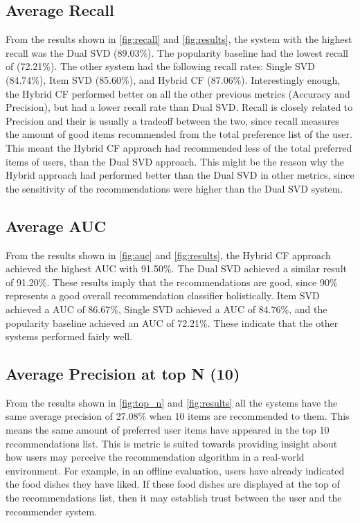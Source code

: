 \subsection{Average Recall}

From the results shown in \ref{fig:recall} and \ref{fig:results}, the system with the highest recall was the Dual SVD (89.03\%). The popularity baseline had the lowest recall of (72.21\%). The other system had the following recall rates: Single SVD (84.74\%), Item SVD (85.60\%), and Hybrid CF (87.06\%). Interestingly enough, the Hybrid CF performed better on all the other previous metrics (Accuracy and Precision), but had a lower recall rate than Dual SVD. Recall is closely related to Precision and their is usually a tradeoff between the two, since recall measures the amount of good items recommended from the total preference list of the user. This meant the Hybrid CF approach had recommended less of the total preferred items of users, than the Dual SVD approach. This might be the reason why the Hybrid approach had performed better than the Dual SVD in other metrics, since the sensitivity of the recommendations were higher than the Dual SVD system.

\subsection{Average AUC}

From the results shown in \ref{fig:auc} and \ref{fig:results}, the Hybrid CF approach achieved the highest AUC with 91.50\%. The Dual SVD achieved a similar result of 91.20\%. These results imply that the recommendations are good, since 90\% represents a good overall recommendation classifier holistically. Item SVD achieved a AUC of 86.67\%, Single SVD achieved a AUC of 84.76\%, and the popularity baseline achieved an AUC of 72.21\%. These indicate that the other systems performed fairly well. 

\subsection{Average Precision at top N (10)}

From the results shown in \ref{fig:top_n} and \ref{fig:results} all the systems have the same average precision of 27.08\% when 10 items are recommended to them. This means the same amount of preferred user items have appeared in the top 10 recommendations list. This is metric is suited towards providing insight about how users may perceive the recommendation algorithm in a real-world environment. For example, in an offline evaluation, users have already indicated the food dishes they have liked. If these food dishes are displayed at the top of the recommendations list, then it may establish trust between the user and the recommender system. 

